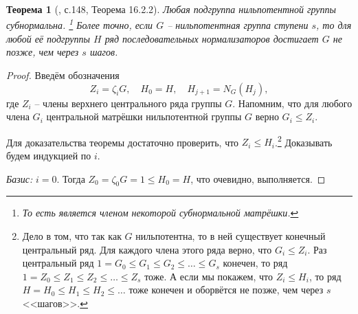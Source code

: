 \documentclass{article}
\newtheorem{theorem}{Теорема}[section]
\begin{document}
\begin{theorem}[\cite{kargapolov}, с.148, Теорема 16.2.2] \label{heruil}
    Любая подгруппа нильпотентной группы субнормальна. \footnote{То есть является членом некоторой субнормальной матрёшки.} Более точно, если $G$ -- нильпотентная группа ступени $s$, то для любой её подгруппы $H$ ряд последовательных нормализаторов достигает $G$ не позже, чем через $s$ шагов.
\end{theorem}
\begin{proof}
    Введём обозначения $$ Z_i = \zeta_i G, \quad H_0 = H, \quad H_{j + 1} = N_G(H_j), $$
    где $Z_i$ -- члены верхнего центрального ряда группы $G$. Напомним, что для любого члена $G_i$ центральной матрёшки нильпотентной группы $G$ верно $G_i \leqslant Z_i$.

    Для доказательства теоремы достаточно проверить, что $Z_i \leqslant H_i$.\footnote{Дело в том, что так как $G$ нильпотентна, то в ней существует конечный центральный ряд. Для каждого члена этого ряда верно, что $G_i \leqslant Z_i$. Раз центральный ряд $1 = G_0 \leqslant G_1 \leqslant G_2 \leqslant \ldots \leqslant G_s$ конечен, то ряд $1 = Z_0 \leqslant Z_1 \leqslant Z_2 \leqslant \ldots \leqslant Z_s$ тоже. А если мы покажем, что $Z_i \leqslant H_i$, то ряд $H = H_0 \leqslant H_1 \leqslant H_2 \leqslant \ldots$ тоже конечен и оборвётся не позже, чем через $s$ <<шагов>>.}
    Доказывать будем индукцией по $i$.

    \textit{Базис:} $i = 0$. Тогда $Z_0 = \zeta_0 G = 1 \leqslant H_0 = H $, что очевидно, выполняется.


\end{proof}
\end{document}

